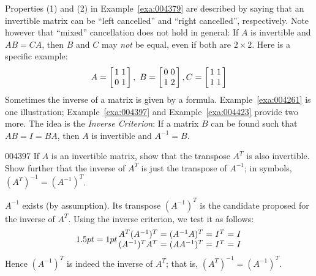 \noindent Properties (1) and (2) in Example~\ref{exa:004379} are described by saying that an invertible matrix can be ``left cancelled'' and ``right cancelled'', respectively. Note however that ``mixed'' cancellation does not hold in general: If $A$ is invertible and $AB = CA$, then $B$ and $C$ may \textit{not} be equal, even if both are $2 \times 2$. Here is a specific example:
\begin{equation*}
A = \leftB \begin{array}{rr}
1 & 1 \\
0 & 1
\end{array} \rightB,\ B = \leftB \begin{array}{rr}
0 & 0 \\
1 & 2
\end{array} \rightB, C = \leftB \begin{array}{rr}
1 & 1 \\
1 & 1
\end{array} \rightB
\end{equation*}
Sometimes the inverse of a matrix is given by a formula. Example~\ref{exa:004261} is one illustration; Example~\ref{exa:004397} and Example~\ref{exa:004423} provide two more. The idea is the \textit{Inverse Criterion}: If a matrix $B$ can be found such that $AB = I = BA$, then $A$ is invertible and $A^{-1} = B$.


\begin{example}{}{004397}
If $A$ is an invertible matrix, show that the transpose $A^{T}$ is also invertible. Show further that the inverse of $A^{T}$ is just the transpose of $A^{-1}$; in symbols, $(A^{T})^{-1} = (A^{-1})^{T}$.


\begin{solution}
  $A^{-1}$ exists (by assumption). Its transpose $(A^{-1})^{T}$ is the candidate proposed for the inverse of $A^{T}$. Using the inverse criterion, we test it as follows:
\begin{equation*}
\arraycolsep=1pt
\begin{array}{lllllll}
A^{T}(A^{-1})^{T} & = & (A^{-1}A)^{T} & = & I^{T} & = & I \\
(A^{-1})^{T}A^{T} & = & (AA^{-1})^{T} & = & I^{T} & = & I
\end{array}
\end{equation*}
Hence $(A^{-1})^{T}$ is indeed the inverse of $A^{T}$; that is, $(A^{T})^{-1} = (A^{-1})^{T}$.
\end{solution}
\end{example}


